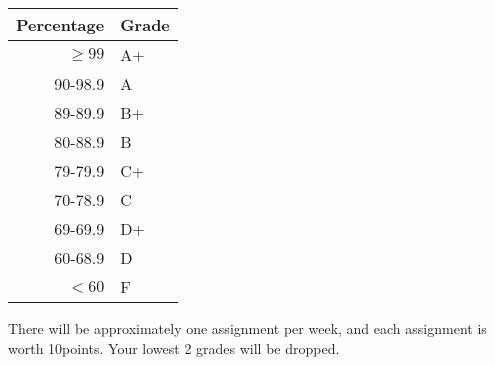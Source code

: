 \documentclass{tufte-handout}
\begin{document}
\begin{margintable}
\begin{tabular}{rl}
Percentage & Grade \\
\hline 
$\ge99$ & A+ \\
90-98.9 & A \\
89-89.9 & B+ \\
80-88.9 & B \\
79-79.9 & C+ \\
70-78.9 & C \\
69-69.9 & D+ \\
60-68.9 & D \\
$<60$ & F \\
\hline
\end{tabular}
\end{margintable}



There will be approximately one assignment per week, and each assignment is worth 10points. Your lowest 2 grades will be dropped. 
\end{document}
